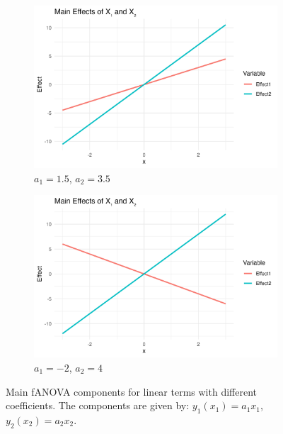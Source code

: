 \begin{figure}[htpb]
    \centering
    \begin{subfigure}[t]{0.49\textwidth}
        \centering
        \includegraphics[width=\textwidth]{images/linear_a1p15_a2p35_a11p00_a22p00_a12p00_rhop00_main.png}
        \caption{$a_1 = 1.5$, $a_2 = 3.5$}
    \end{subfigure}%
    \hfill
    \begin{subfigure}[t]{0.49\textwidth}
        \centering
        \includegraphics[width=\textwidth]{images/linear_a1m20_a2p40_a11p00_a22p00_a12p00_rhop00_main.png}
        \caption{$a_1 = -2$, $a_2 = 4$}
    \end{subfigure}
    \caption{Main fANOVA components for linear terms with different coefficients. The components are given by: $y_1(x_1) = a_1 x_1$, $y_2(x_2) = a_2 x_2$.}
    \label{fig:linear_main_effects}
\end{figure}



